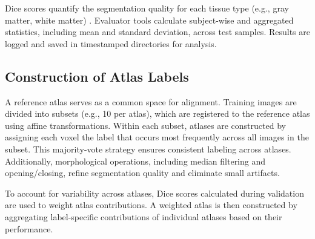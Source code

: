 Dice scores quantify the segmentation quality for each tissue type (e.g., gray matter, white matter) \cite{b12}. Evaluator tools calculate subject-wise and aggregated statistics, including mean and standard deviation, across test samples. Results are logged and saved in timestamped directories for analysis.

\subsection{Construction of Atlas Labels}
A reference atlas serves as a common space for alignment. Training images are divided into subsets (e.g., 10 per atlas), which are registered to the reference atlas using affine transformations. Within each subset, atlases are constructed by assigning each voxel the label that occurs most frequently across all images in the subset. This majority-vote strategy ensures consistent labeling across atlases. Additionally, morphological operations, including median filtering and opening/closing, refine segmentation quality and eliminate small artifacts.

To account for variability across atlases, Dice scores calculated during validation are used to weight atlas contributions. A weighted atlas is then constructed by aggregating label-specific contributions of individual atlases based on their performance.




